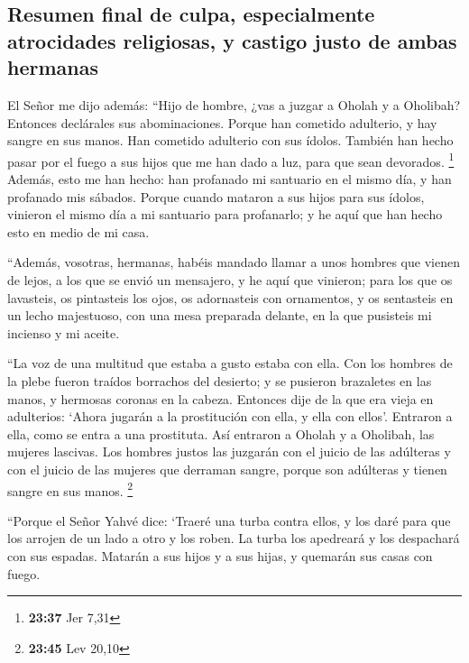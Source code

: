 \hypertarget{resumen-final-de-culpa-especialmente-atrocidades-religiosas-y-castigo-justo-de-ambas-hermanas}{%
\subsection{Resumen final de culpa, especialmente atrocidades
religiosas, y castigo justo de ambas
hermanas}\label{resumen-final-de-culpa-especialmente-atrocidades-religiosas-y-castigo-justo-de-ambas-hermanas}}

 El Señor me dijo además: ``Hijo de hombre, ¿vas a juzgar
a Oholah y a Oholibah? Entonces declárales sus abominaciones.
 Porque han cometido adulterio, y hay sangre en sus
manos. Han cometido adulterio con sus ídolos. También han hecho pasar
por el fuego a sus hijos que me han dado a luz, para que sean devorados.
\footnote{\textbf{23:37} Jer 7,31}  Además, esto me han
hecho: han profanado mi santuario en el mismo día, y han profanado mis
sábados.  Porque cuando mataron a sus hijos para sus
ídolos, vinieron el mismo día a mi santuario para profanarlo; y he aquí
que han hecho esto en medio de mi casa.

 ``Además, vosotras, hermanas, habéis mandado llamar a
unos hombres que vienen de lejos, a los que se envió un mensajero, y he
aquí que vinieron; para los que os lavasteis, os pintasteis los ojos, os
adornasteis con ornamentos,  y os sentasteis en un lecho
majestuoso, con una mesa preparada delante, en la que pusisteis mi
incienso y mi aceite.

 ``La voz de una multitud que estaba a gusto estaba con
ella. Con los hombres de la plebe fueron traídos borrachos del desierto;
y se pusieron brazaletes en las manos, y hermosas coronas en la cabeza.
 Entonces dije de la que era vieja en adulterios: `Ahora
jugarán a la prostitución con ella, y ella con ellos'. 
Entraron a ella, como se entra a una prostituta. Así entraron a Oholah y
a Oholibah, las mujeres lascivas.  Los hombres justos las
juzgarán con el juicio de las adúlteras y con el juicio de las mujeres
que derraman sangre, porque son adúlteras y tienen sangre en sus manos.
\footnote{\textbf{23:45} Lev 20,10}

 ``Porque el Señor Yahvé dice: `Traeré una turba contra
ellos, y los daré para que los arrojen de un lado a otro y los roben.
 La turba los apedreará y los despachará con sus espadas.
Matarán a sus hijos y a sus hijas, y quemarán sus casas con fuego.

